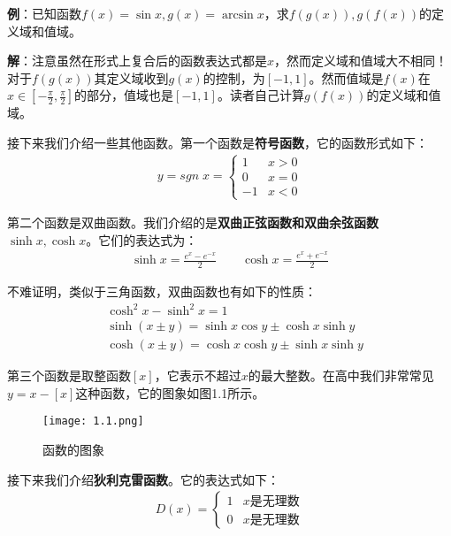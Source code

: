 \documentclass{ctexart}
\let\oldtextbf\textbf %
\renewcommand{\textbf}[1]{\textcolor{btex}{\oldtextbf{#1}}} %
\begin{document}
\textbf{\color{btex}例}：已知函数$f(x)=\sin x,g(x)=\arcsin x$，求$f(g(x)),g(f(x))$的定义域和值域。

\textbf{\color{btex}解}：注意虽然在形式上复合后的函数表达式都是$x$，然而定义域和值域大不相同！对于$f(g(x))$其定义域收到$g(x)$的控制，为$[-1,1]$。然而值域是$f(x)$在$x\in[-\frac{\pi}{2},\frac{\pi}{2}]$的部分，值域也是$[-1,1]$。读者自己计算$g(f(x))$的定义域和值域。

接下来我们介绍一些其他函数。第一个函数是\textbf{\color{btex}符号函数}，它的函数形式如下：
\begin{align*}
    y=sgn \;x=\begin{cases}
        1 & x>0\\
        0 &x=0\\
        -1 & x<0
    \end{cases}
\end{align*}

第二个函数是双曲函数。我们介绍的是\textbf{\color{btex}双曲正弦函数和双曲余弦函数$\sinh x,\cosh x$}。它们的表达式为：
\begin{align*}
    \sinh x=\frac{e^x-e^{-x}}{2}\qquad \cosh x=\frac{e^x+e^{-x}}{2}
\end{align*}

不难证明，类似于三角函数，双曲函数也有如下的性质：
\begin{align*}
   & \cosh^2 x-\sinh ^2 x=1\\
    & \sinh (x\pm y)=\sinh x\cos y\pm \cosh x\sinh y\\
    &\cosh(x\pm y)=\cosh{x}\cosh{y}\pm \sinh{x}\sinh{y}
\end{align*}

第三个函数是取整函数$[x]$，它表示不超过$x$的最大整数。在高中我们非常常见$y=x-[x]$这种函数，它的图象如图1.1所示。
\begin{figure}[H]    
\centering     
\renewcommand{\figurename}{图}     
\renewcommand{\thefigure}{1.1}    
\begin{myimagebox}[width=0.5\textwidth] %
\texttt{[image: 1.1.png]} %
\end{myimagebox}     
\caption{\label{fig:1.1}函数的图象}   
\end{figure}

接下来我们介绍\textbf{\color{btex}狄利克雷函数}。它的表达式如下：
\begin{align*}
    D(x)=\begin{cases}
        1 & x\text{是无理数}\\
        0 & x\text{是无理数}
    \end{cases}
\end{align*}
\end{document}
